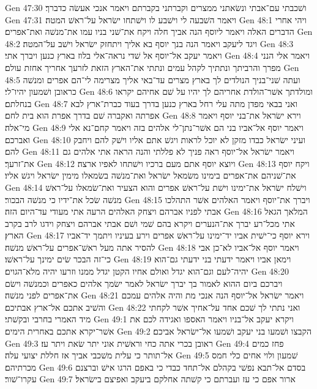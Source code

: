 Gen 47:30  ושׁכבתי עם־אבתי ונשׂאתני ממצרים וקברתני בקברתם ויאמר אנכי אעשׂה כדברך׃
Gen 47:31  ויאמר השׁבעה לי וישׁבע לו וישׁתחו ישׂראל על־ראשׁ המטה׃
Gen 48:1  ויהי אחרי הדברים האלה ויאמר ליוסף הנה אביך חלה ויקח את־שׁני בניו עמו את־מנשׁה ואת־אפרים׃
Gen 48:2  ויגד ליעקב ויאמר הנה בנך יוסף בא אליך ויתחזק ישׂראל וישׁב על־המטה׃
Gen 48:3  ויאמר יעקב אל־יוסף אל שׁדי נראה־אלי בלוז בארץ כנען ויברך אתי׃
Gen 48:4  ויאמר אלי הנני מפרך והרביתך ונתתיך לקהל עמים ונתתי את־הארץ הזאת לזרעך אחריך אחזת עולם׃
Gen 48:5  ועתה שׁני־בניך הנולדים לך בארץ מצרים עד־באי אליך מצרימה לי־הם אפרים ומנשׁה כראובן ושׁמעון יהיו־לי׃
Gen 48:6  ומולדתך אשׁר־הולדת אחריהם לך יהיו על שׁם אחיהם יקראו בנחלתם׃
Gen 48:7  ואני בבאי מפדן מתה עלי רחל בארץ כנען בדרך בעוד כברת־ארץ לבא אפרתה ואקברה שׁם בדרך אפרת הוא בית לחם׃
Gen 48:8  וירא ישׂראל את־בני יוסף ויאמר מי־אלה׃
Gen 48:9  ויאמר יוסף אל־אביו בני הם אשׁר־נתן־לי אלהים בזה ויאמר קחם־נא אלי ואברכם׃
Gen 48:10  ועיני ישׂראל כבדו מזקן לא יוכל לראות ויגשׁ אתם אליו וישׁק להם ויחבק להם׃
Gen 48:11  ויאמר ישׂראל אל־יוסף ראה פניך לא פללתי והנה הראה אתי אלהים גם את־זרעך׃
Gen 48:12  ויוצא יוסף אתם מעם ברכיו וישׁתחו לאפיו ארצה׃
Gen 48:13  ויקח יוסף את־שׁניהם את־אפרים בימינו משׂמאל ישׂראל ואת־מנשׁה בשׂמאלו מימין ישׂראל ויגשׁ אליו׃
Gen 48:14  וישׁלח ישׂראל את־ימינו וישׁת על־ראשׁ אפרים והוא הצעיר ואת־שׂמאלו על־ראשׁ מנשׁה שׂכל את־ידיו כי מנשׁה הבכור׃
Gen 48:15  ויברך את־יוסף ויאמר האלהים אשׁר התהלכו אבתי לפניו אברהם ויצחק האלהים הרעה אתי מעודי עד־היום הזה׃
Gen 48:16  המלאך הגאל אתי מכל־רע יברך את־הנערים ויקרא בהם שׁמי ושׁם אבתי אברהם ויצחק וידגו לרב בקרב הארץ׃
Gen 48:17  וירא יוסף כי־ישׁית אביו יד־ימינו על־ראשׁ אפרים וירע בעיניו ויתמך יד־אביו להסיר אתה מעל ראשׁ־אפרים על־ראשׁ מנשׁה׃
Gen 48:18  ויאמר יוסף אל־אביו לא־כן אבי כי־זה הבכר שׂים ימינך על־ראשׁו׃
Gen 48:19  וימאן אביו ויאמר ידעתי בני ידעתי גם־הוא יהיה־לעם וגם־הוא יגדל ואולם אחיו הקטן יגדל ממנו וזרעו יהיה מלא־הגוים׃
Gen 48:20  ויברכם ביום ההוא לאמור בך יברך ישׂראל לאמר ישׂמך אלהים כאפרים וכמנשׁה וישׂם את־אפרים לפני מנשׁה׃
Gen 48:21  ויאמר ישׂראל אל־יוסף הנה אנכי מת והיה אלהים עמכם והשׁיב אתכם אל־ארץ אבתיכם׃
Gen 48:22  ואני נתתי לך שׁכם אחד על־אחיך אשׁר לקחתי מיד האמרי בחרבי ובקשׁתי׃
Gen 49:1  ויקרא יעקב אל־בניו ויאמר האספו ואגידה לכם את אשׁר־יקרא אתכם באחרית הימים׃
Gen 49:2  הקבצו ושׁמעו בני יעקב ושׁמעו אל־ישׂראל אביכם׃
Gen 49:3  ראובן בכרי אתה כחי וראשׁית אוני יתר שׂאת ויתר עז׃
Gen 49:4  פחז כמים אל־תותר כי עלית משׁכבי אביך אז חללת יצועי עלה׃
Gen 49:5  שׁמעון ולוי אחים כלי חמס מכרתיהם׃
Gen 49:6  בסדם אל־תבא נפשׁי בקהלם אל־תחד כבדי כי באפם הרגו אישׁ וברצנם עקרו־שׁור׃
Gen 49:7  ארור אפם כי עז ועברתם כי קשׁתה אחלקם ביעקב ואפיצם בישׂראל׃
